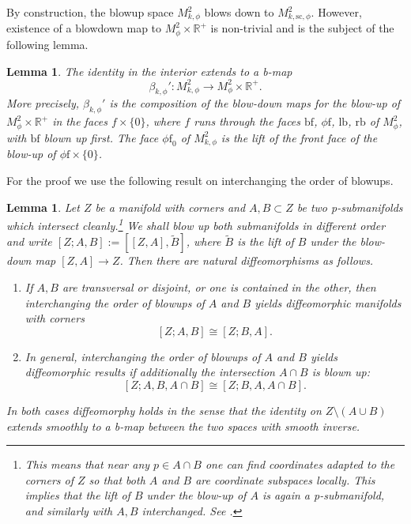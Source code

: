 \documentclass[JEP,XML,SOM,Unicode,NoFloatCountersInSection,published]{cedram}
\newenvironment{enumeratea}
{\bgroup\def\theenumi{\alph{enumi}}\begin{enumerate}}
{\end{enumerate}\egroup}
\theoremstyle{plain}
\newtheorem{Lemma}[Th]{Lemma}
\theoremstyle{definition}
\newcommand{\R}{{\mathbb{R}}}
\newcommand{\phif}{{\phi\mathrm{f}}}
\newcommand{\lf}{{\mathrm{lb}}}
\newcommand{\rf}{{\mathrm{rb}}}
\newcommand{\bbf}{{\mathrm{bf}}}
\newcommand{\ssc}{{\mathrm{sc}}}
\begin{document}
By construction, the blowup space $M^{2}_{k, \phi}$
blows down to
$M^{2}_{k, \ssc,\phi}$. However, existence of a blowdown map to
$M^{2}_{\phi} \times \R^+$ is non-trivial and is the subject of the
following lemma.

\begin{Lemma} \label{lemma b-map cons}
The identity in the interior extends to a b-map
\[
\beta_{k,\phi}' : M^{2}_{k,\phi} \to M^{2}_{\phi}\times \R^+.
\]
More precisely, $\beta_{k,\phi}'$ is the composition of the blow-down maps for the blow-up of $M^2_\phi\times \R^+$ in the faces $f\times\{0\}$, where $f$ runs through the faces $\bbf$, $\phif$, $\lf$, $\rf$ of $M^2_\phi$, with $\bbf$ blown up first.
The face $\phif_0$ of $M^2_{k,\phi}$ is the lift of the front face of the blow-up of $\phif\times\{0\}$.
\end{Lemma}

For the proof we use the following result on interchanging the
order of blowups.

\begin{Lemma} \label{lem:commuting blow-ups}
Let $Z$ be a manifold with corners and $A,B\subset Z$ be two
p-submanifolds which intersect cleanly.\footnote{This means that near any $p\in A\cap B$ one can find coordinates adapted to the corners
of $Z$ so that both $A$ and $B$ are coordinate subspaces locally. This implies that the lift of $B$ under the blow-up of $A$ is again a p-submanifold, and similarly with $A,B$ interchanged. See \cite[Prop.\,5.7.2]{Mel-diff}.} We shall blow up both submanifolds in different order and
write \eg $[Z;A,B] := [[Z,A],\widetilde{B}]$, where $\widetilde{B}$ is the lift of
$B$ under the blow-down map $[Z,A]\to Z$. Then there are natural diffeomorphisms as follows.

\begin{enumeratea}
\item\label{lem:commuting blow-upsa}
If $A,B$ are transversal or disjoint, or one is contained in the other, then
interchanging the order of blowups of $A$ and $B$ yields diffeomorphic manifolds with corners
\[
[Z;A,B]\cong[Z;B,A].
\]

\item\label{lem:commuting blow-upsb}
In general, interchanging the order of blowups of
$A$ and $B$ yields diffeomorphic results if additionally the intersection $A\cap B$ is blown up:
\[
[Z; A,B,A\cap B] \cong [Z; B, A, A\cap B].
\]
\end{enumeratea}
In both cases diffeomorphy holds in the sense that the identity on $Z\setminus(A\cup B)$ extends smoothly to a b-map
between the two spaces with smooth inverse.
\end{Lemma}
\end{document}
